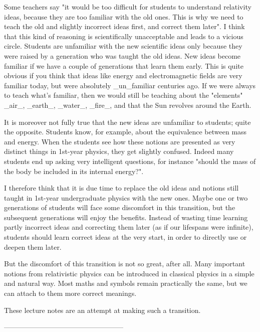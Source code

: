 Some teachers say "it would be too difficult for students to understand relativity ideas, because they are too familiar with the old ones. This is why we need to teach the old and slightly incorrect ideas first, and correct them later". I think that this kind of reasoning is scientifically unacceptable and leads to a vicious circle. Students are unfamiliar with the new scientific ideas only because they were raised by a generation who was taught the old ideas. New ideas become familiar if we have a couple of generations that learn them early. This is quite obvious if you think that ideas like energy and electromagnetic fields are very familiar today, but were absolutely _un_familiar centuries ago. If we were always to teach what's familiar, then we would still be teaching about the "elements" _air_, _earth_, _water_, _fire_, and that the Sun revolves around the Earth.

It is moreover not fully true that the new ideas are unfamiliar to students; quite the opposite. Students know, for example, about the equivalence between mass and energy. When the students see how these notions are presented as very distinct things in 1st-year physics, they get slightly confused. Indeed many students end up asking very intelligent questions, for instance "should the mass of the body be included in its internal energy?".

I therefore think that it is due time to replace the old ideas and notions still taught in 1st-year undergraduate physics with the new ones. Maybe one or two generations of students will face some discomfort in this transition, but the subsequent generations will enjoy the benefits. Instead of wasting time learning partly incorrect ideas and correcting them later (as if our lifespans were infinite), students should learn correct ideas at the very start, in order to directly use or deepen them later.

But the discomfort of this transition is not so great, after all. Many important notions from relativistic physics can be introduced in classical physics in a simple and natural way. Most maths and symbols remain practically the same, but we can attach to them more correct meanings.

These lecture notes are an attempt at making such a transition.

---------------------------------------------------

\usepackage[no-files]{xsim}
{%
\tcolorbox[
breakable ,
boxrule=0mm ,
colback = yellow!10!white ,
colframe = white ,
colbacktitle = yellow ,
coltitle = black ,
title =
\textbf{\small\GetExerciseName~\GetExerciseProperty{counter}}%
\GetExercisePropertyT{subtitle}{ \textit{\PropertyValue}}%
\IfInsideSolutionF{%
\GetExercisePropertyT{points}{ %
(%
\printgoal{\PropertyValue}
\IfExerciseGoalSingularTF{points}
{\XSIMtranslate{point}}
{\XSIMtranslate{points}}%
)%
}%
}%
]%
\small}
{\endtcolorbox}

